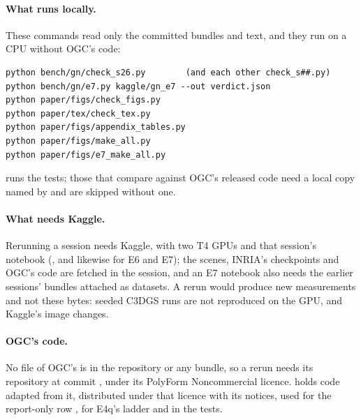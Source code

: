 

\paragraph{What runs locally.}
These commands read only the committed bundles and text, and they run on a CPU without OGC's code:

\begin{verbatim}
python bench/gn/check_s26.py        (and each other check_s##.py)
python bench/gn/e7.py kaggle/gn_e7 --out verdict.json
python paper/figs/check_figs.py
python paper/tex/check_tex.py
python paper/figs/appendix_tables.py
python paper/figs/make_all.py
python paper/figs/e7_make_all.py
\end{verbatim}

 runs the tests; those that compare against OGC's released code need a local copy named by  and are skipped without one.

\paragraph{What needs Kaggle.}
Rerunning a session needs Kaggle, with two T4 GPUs and that session's notebook (, and likewise for E6 and E7); the scenes, INRIA's checkpoints and OGC's code are fetched in the session, and an E7 notebook also needs the earlier sessions' bundles attached as datasets. %
A rerun would produce new measurements and not these bytes: seeded C3DGS runs are not reproduced on the GPU, and Kaggle's image changes. %

\paragraph{OGC's code.}
No file of OGC's is in the repository or any bundle, so a rerun needs its repository at commit , under its PolyForm Noncommercial licence. %
 holds code adapted from it, distributed under that licence with its notices, used for the report-only row , for E4q's ladder and in the tests. %
\par\endgroup
